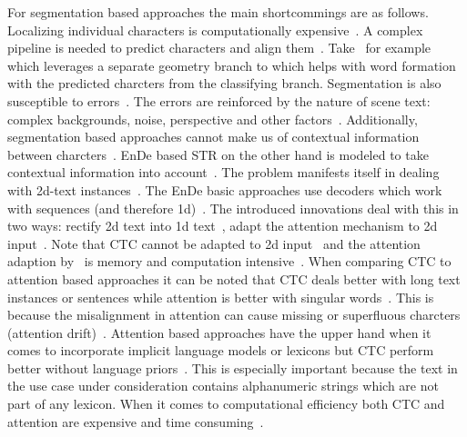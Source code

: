 For segmentation based approaches the main shortcommings are as follows.
Localizing individual characters is computationally expensive~\citep{zhan_esir_2019}.
A complex pipeline is needed to predict characters and align them~\citep{liu_abcnet_2020}.
Take~\cite{wan_textscanner_2020} for example which leverages a separate geometry branch
to which helps with word formation with the predicted charcters from the classifying branch.
Segmentation is also susceptible to errors~\citep{zhan_esir_2019,cheng_aon_2018,chen_text_2021}.
The errors are reinforced by the nature of scene text: complex backgrounds, noise, perspective
and other factors~\citep{hu_gtc_2020,chen_text_2021,baek_what_2019}.
Additionally, segmentation based approaches cannot make us of contextual information between
charcters~\citep{chen_text_2021}.
\ac{EnDe} based \ac{STR} on the other hand is modeled to take contextual information into
account~\citep{long_scene_2021,chen_text_2021}.
The problem manifests itself in dealing with 2d-text
instances~\citep{long_scene_2021,liao_scene_2018}.
The \ac{EnDe} basic approaches use decoders which work with sequences (and therefore
1d)~\citep{long_scene_2021,cheng_aon_2018}.
The introduced innovations deal with this in two ways: rectify 2d text into 1d
text~\citep{zhan_esir_2019,luo_multi-object_2019,shi_aster_2019,liu_char-net_2018}, adapt the
attention mechanism to 2d input~\citep{li_show_2019}.
Note that \ac{CTC} cannot be adapted to 2d input~\citep{cheng_focusing_2017,xie_aggregation_2019}
and the attention adaption by~\cite{li_show_2019} is memory and computation
intensive~\citep{xie_aggregation_2019}.
When comparing \ac{CTC} to attention based approaches it can be noted that \ac{CTC} deals better
with long text instances or sentences while attention is better with singular
words~\citep{cong_comparative_2019,chen_text_2021}.
This is because the misalignment in attention can cause missing or superfluous charcters (attention
drift)~\citep{bai_edit_2018,liao_scene_2018,cheng_focusing_2017}.
Attention based approaches have the upper hand when it comes to incorporate implicit language models
or lexicons but \ac{CTC} perform better without language priors~\citep{cong_comparative_2019}.
This is especially important because the text in the use case under consideration contains
alphanumeric strings which are not part of any lexicon.
When it comes to computational efficiency both \ac{CTC} and attention are expensive and time
consuming~\citep{chen_text_2021}.

